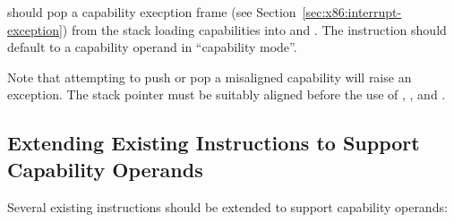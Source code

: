  should pop a capability execption frame (see
Section~\ref{sec:x86:interrupt-exception}) from the stack loading
capabilities into \CIP{} and \CSP{}.  The  instruction
should default to a capability operand in ``capability mode''.

Note that attempting to push or pop a misaligned capability will raise
an exception.  The stack pointer must be suitably aligned before the
use of , , and .

\subsection{Extending Existing Instructions to Support Capability Operands}

Several existing instructions should be extended to support
capability operands:

